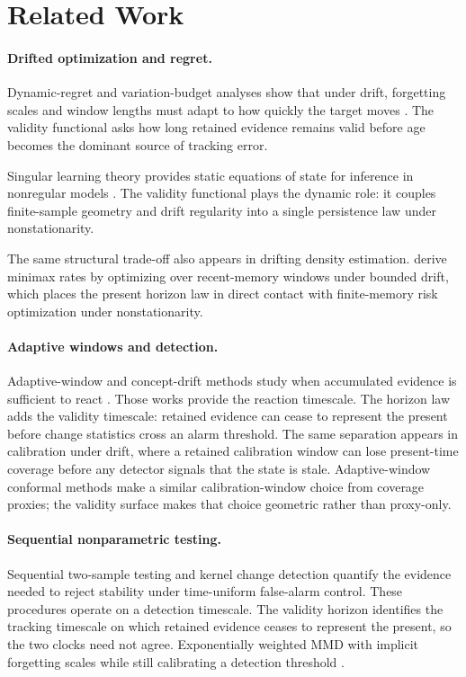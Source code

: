 \section{Related Work}\label{sec:related}

\paragraph{Drifted optimization and regret.}
Dynamic-regret and variation-budget analyses show that under drift, forgetting
scales and window lengths must adapt to how quickly the target moves
\citep{BesbesGurZeevi2015,CheungSimchiLeviZhu2019,YuanLamperski2020,
MazzettoUpfal2023,WangXieChenLuiZhou2024}. The validity functional asks
how long retained evidence remains valid before age becomes the dominant source
of tracking error.

Singular learning theory provides static equations of state for inference in
nonregular models \citep{Watanabe2009}. The validity
functional plays the dynamic role: it couples finite-sample geometry and drift
regularity into a single persistence law under nonstationarity.

The same structural trade-off also appears in drifting density estimation.
\citet{MazzettoUpfal2023} derive minimax rates by optimizing over recent-memory
windows under bounded drift, which places the present horizon law in direct
contact with finite-memory risk optimization under nonstationarity.

\paragraph{Adaptive windows and detection.}
Adaptive-window and concept-drift methods study when accumulated evidence is
sufficient to react \citep{BifetGavalda2007,Gama2004,GamaSurvey2014}. Those works
provide the reaction timescale. The horizon law adds the validity timescale:
retained evidence can cease to represent the present before change statistics
cross an alarm threshold. The same separation appears in calibration under
drift, where a retained calibration window can lose present-time coverage before
any detector signals that the state is stale.
Adaptive-window conformal methods make a similar calibration-window choice from
coverage proxies; the validity surface makes that choice geometric rather than
proxy-only.

\paragraph{Sequential nonparametric testing.}
Sequential two-sample testing and kernel change detection quantify the evidence
needed to reject stability under time-uniform false-alarm control. These
procedures operate on a detection timescale. The validity horizon
identifies the tracking timescale on which retained evidence ceases to represent
the present, so the two clocks need not agree. Exponentially weighted MMD
with implicit forgetting scales while still calibrating a detection threshold
\citep{KalinkeEtAl2025MMDEW}.

